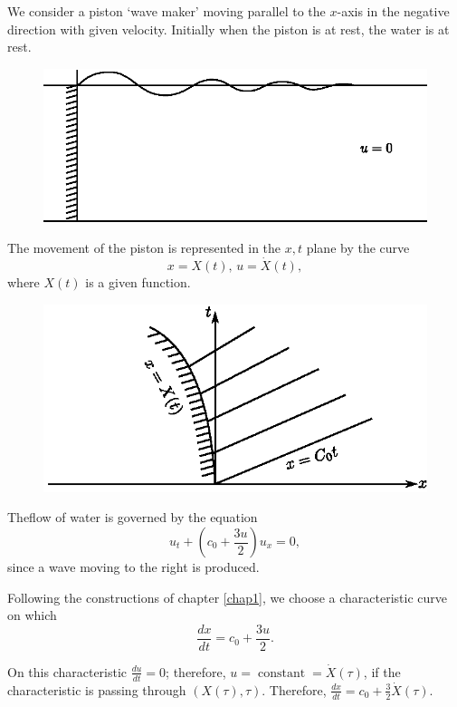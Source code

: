 \begin{example*}
We consider a piston `wave maker' moving parallel to the $x$-axis in the negative direction with given velocity. Initially when the piston is at rest, the water is at rest.
\begin{figure}[H]
\centering
\includegraphics{figures/fig61-4.2.eps}
\caption{}
\label{chap1:fig4.2}
\end{figure}

The movement of the piston is represented in the $x,t$ plane by the curve
$$
x=X(t),\,u=\dot{X}(t),
$$
where $X(t)$ is a given function.
\begin{figure}[H]
\centering
\includegraphics{figures/fig61-4.3.eps}
\caption{}
\label{chap1:fig4.3}
\end{figure}
\end{example*}

The\pageoriginale flow of water is governed by the equation 
$$
u_t+\left(c_0+\frac{3u}{2}\right)u_x=0,
$$
since a wave moving to the right is produced.

Following the constructions of chapter \ref{chap1}, we choose a characteristic curve on which 
$$
\frac{dx}{dt}=c_0+\frac{3u}{2}.
$$

On this characteristic $\frac{du}{dt}=0$; therefore, $u=\;\text{constant}\; = \dot{X}(\tau)$, if the characteristic is passing through $(X(\tau),\tau)$. Therefore, $\frac{dx}{dt}=c_0+\frac{3}{2}\dot{X} (\tau)$. 

